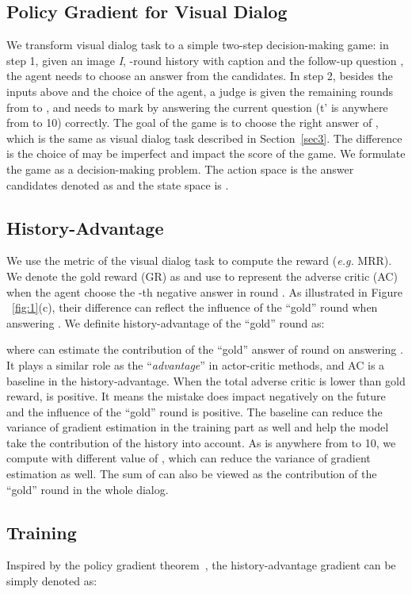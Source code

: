 \documentclass[10pt,twocolumn,letterpaper]{article}
\begin{document}
\subsection{Policy Gradient for Visual Dialog}\label{sec:4.1}
We transform visual dialog task to a simple two-step decision-making game: in step 1, given an image \emph{I}, -round history with caption  and the follow-up question , the agent needs to choose an answer from the candidates. In step 2, besides the inputs above and the choice of the agent, a judge is given the remaining rounds from  to , and needs to mark by answering the current question  (t' is anywhere from  to 10) correctly. The goal of the game is to choose the right answer of , which is the same as visual dialog task described in Section~\ref{sec3}. The difference is the choice of  may be imperfect and impact the score of the game. We formulate the game as a decision-making problem. The action space is the answer candidates denoted as  and the state space is . 






\subsection{History-Advantage}\label{sec:4.2}
 We use the metric of the visual dialog task to compute the reward (\emph{e.g.} MRR). We denote the gold reward (GR) as  and use  to represent the adverse critic (AC) when the agent choose the -th negative answer in round . As illustrated in Figure ~\ref{fig:1}(c), their difference  can reflect the influence of the ``gold'' round  when answering . We definite history-advantage of the ``gold'' round  as:
 
 
where  can estimate the contribution of the ``gold'' answer of round  on answering . It plays a similar role as the ``\emph{advantage}'' in actor-critic methods, and AC is a baseline in the history-advantage. When the total adverse critic is lower than gold reward,  is positive. It means the mistake does impact negatively on the future and the influence of the ``gold'' round is positive. The baseline can reduce the variance of gradient estimation in the training part as well and help the model take the contribution of the history into account. As  is anywhere from  to 10, we compute  with different value of , which can reduce the variance of gradient estimation as well. The sum of  can also be viewed as the contribution of the ``gold'' round in the whole dialog. 


\subsection{Training}\label{sec:4.3}
Inspired by the policy gradient theorem~\cite{sutton2000policy}, the history-advantage gradient can be simply denoted as:
 
\end{document}
